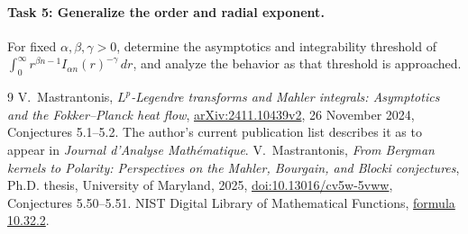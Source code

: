\documentclass[11pt]{article}
\begin{document}
\paragraph{Task 5: Generalize the order and radial exponent.}
For fixed \(\alpha,\beta,\gamma>0\), determine the asymptotics and
integrability threshold of
\(\int_0^\infty r^{\beta n-1}I_{\alpha n}(r)^{-\gamma}\,dr\),
and analyze the behavior as that threshold is approached.

\begin{thebibliography}{9}
V.~Mastrantonis,
\emph{\(L^p\)-Legendre transforms and Mahler integrals:
Asymptotics and the Fokker--Planck heat flow},
\href{https://arxiv.org/abs/2411.10439}{arXiv:2411.10439v2},
26 November 2024, Conjectures 5.1--5.2.
The author's current publication list describes it as to appear in
\emph{Journal d'Analyse Math\'ematique}.
V.~Mastrantonis,
\emph{From Bergman kernels to Polarity: Perspectives on the
Mahler, Bourgain, and Blocki conjectures},
Ph.D. thesis, University of Maryland, 2025,
\href{https://doi.org/10.13016/cv5w-5vww}{doi:10.13016/cv5w-5vww},
Conjectures 5.50--5.51.
NIST Digital Library of Mathematical Functions,
\href{https://dlmf.nist.gov/10.32.E2}{formula 10.32.2}.
\end{thebibliography}
\end{document}
